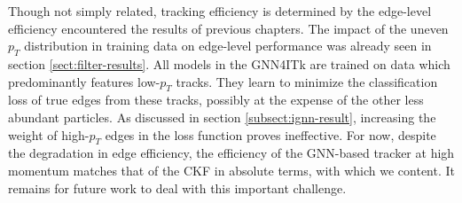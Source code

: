 Though not simply related, tracking efficiency is determined by the edge-level efficiency encountered the results of previous chapters.
The impact of the uneven $p_T$ distribution in training data on edge-level performance was already seen in section \ref{sect:filter-results}. 
All models in the GNN4ITk are trained on data which predominantly features low-$p_T$ tracks. 
They learn to minimize the classification loss of true edges from these tracks, possibly at the expense of the other less abundant particles.
As discussed in section \ref{subsect:ignn-result}, increasing the weight of high-$p_T$ edges in the loss function proves ineffective.
For now, despite the degradation in edge efficiency, the efficiency of the GNN-based tracker at high momentum matches that of the CKF in absolute terms, with which we content. 
It remains for future work to deal with this important challenge.



